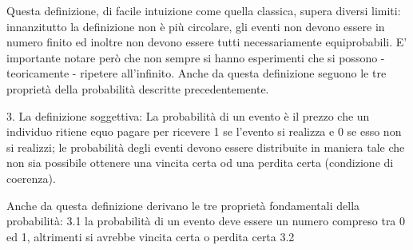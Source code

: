 \documentclass{book}
\begin{document}
Questa definizione, di facile intuizione come quella classica, supera diversi limiti: innanzitutto la definizione non \`{e} più circolare, gli eventi non devono essere in numero finito ed inoltre non devono essere tutti necessariamente equiprobabili.
E' importante notare però che non sempre si hanno esperimenti che si possono - teoricamente - ripetere all'infinito.
Anche da questa definizione seguono le tre propriet\`{a} della probabilit\`{a} descritte precedentemente.

3. La definizione soggettiva:
La probabilit\`{a} di un evento \`{e} il prezzo che un individuo ritiene equo pagare per ricevere 1 se l'evento si realizza e 0 se esso non si realizzi; le probabilit\`{a} degli eventi devono essere distribuite in maniera tale che non sia possibile ottenere una vincita certa od una perdita certa (condizione di coerenza).

Anche da questa definizione derivano le tre propriet\`{a} fondamentali della probabilit\`{a}:
3.1 la probabilit\`{a} di un evento deve essere un numero compreso tra 0 ed 1, altrimenti si avrebbe vincita certa o perdita certa
3.2 
\end{document}
